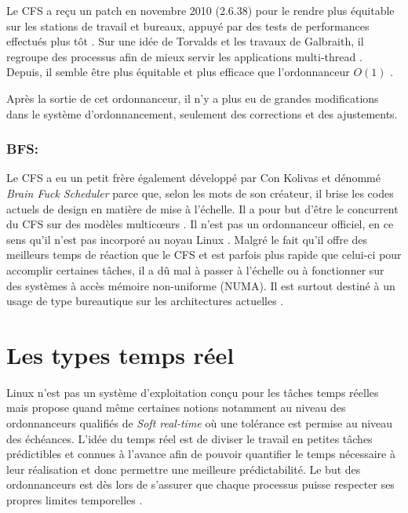 \documentclass[letterpaper]{article}
\begin{document}
Le CFS a reçu un patch en novembre 2010 (2.6.38) pour le rendre plus équitable sur les stations de travail et bureaux, appuyé par des tests de performances effectués plus tôt \citep{7280991}. Sur une idée de Torvalds et les travaux de Galbraith, il regroupe des processus afin de mieux servir les applications multi-thread \citep{Wong:2008:TAF:1400097.1400102}. Depuis, il semble être plus équitable et plus efficace que l'ordonnanceur $O(1)$ \citep{4631872}.

Après la sortie de cet ordonnanceur, il n'y a plus eu de grandes modifications dans le système d'ordonnancement, seulement des corrections et des ajustements.

\subsubsection{BFS:}

Le CFS a eu un petit frère également développé par Con Kolivas et dénommé \textit{Brain Fuck Scheduler} parce que, selon les mots de son créateur, il brise les codes actuels de design en matière de mise à l'échelle. Il a pour but d'être le concurrent du CFS sur des modèles multicœurs \citep{PATCHBFS}. Il n'est pas un ordonnanceur officiel, en ce sens qu'il n'est pas incorporé au noyau Linux \citep{opac-b1133216}. Malgré le fait qu'il offre des meilleurs temps de réaction que le CFS et est parfois plus rapide que celui-ci pour accomplir certaines tâches, il a dû mal à passer à l'échelle ou à fonctionner sur des systèmes à accès mémoire non-uniforme (NUMA). Il est surtout destiné à un usage de type bureautique sur les architectures actuelles \citep{CFSVSBFS}.

\section{Les types temps réel}

Linux n'est pas un système d'exploitation conçu pour les tâches temps réelles mais propose quand même certaines notions notamment au niveau des ordonnanceurs qualifiés de \textit{Soft real-time} où une tolérance est permise au niveau des échéances. L'idée du temps réel est de diviser le travail en petites tâches prédictibles et connues à l'avance afin de pouvoir quantifier le temps nécessaire à leur réalisation et donc permettre une meilleure prédictabilité. Le but des ordonnanceurs est dès lors de s'assurer que chaque processus puisse respecter ses propres limites temporelles \citep{stankovic2012deadline}.
\end{document}
